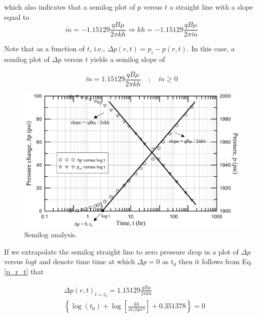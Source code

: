 \documentclass{llncs}
\numberwithin{equation}{section}
\numberwithin{figure}{section}
\numberwithin{table}{section}
\begin{document}
    which also indicates that a semilog plot of $p$ versus $t$  a straight line with a slope equal to
    \begin{equation}
    \widetilde{m}=-1.15129\frac{qB\mu }{2\pi kh}\Rightarrow kh=-1.15129\frac{qB\mu }{2\pi \widetilde{m}}
        \label{slope_p_r_t}
    \end{equation}

    Note that  as a function of $t$, i.e., $\Delta p\left( r,t \right)={{p}_{i}}-p\left( r,t \right)$. In this case, a semilog plot of $\Delta p$ versus $t$ yields a semilog slope of

    \begin{equation}
    \widetilde{m}=1.15129\frac{qB\mu }{2\pi kh}\quad ; \quad \widetilde{m}\geq 0
        \label{slope_dp_r_t}
    \end{equation}

    \begin{figure}
        \begin{center}
        \includegraphics[scale=0.6]{Semilog_dp_vs_p.pdf}
        \end{center}
        \caption{Semilog analysis.}
        \label{Semilog_dp_vs_p}
    \end{figure}

    If we extrapolate the semilog straight line to zero pressure drop in a plot of $\Delta p$ versus $log t$ and denote time time at which $\Delta p=0$ as $t_{0}$ then it follows from Eq. \ref{p_r_t} that

    \begin{equation}
    \begin{split}
     & \Delta p{{\left( r,t \right)}_{t={{t}_{0}}}}=\text{1}\text{.15129}\frac{qB\mu }{2\pi kh} \\
    & \left\{ \log \left( {{t}_{0}} \right)+\log \left[ \frac{kh}{\phi {{c}_{t}}h\mu {{r}^{2}}} \right]+\text{0}\text{.351378} \right\}=0 \\
    \end{split}
        \label{slope_dp_r_t0}
    \end{equation}
\end{document}
